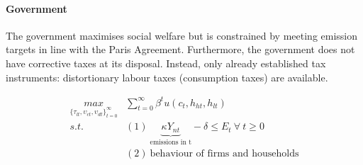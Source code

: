 \begin{comment}
\paragraph{Impossibility of reaching target in laissez-faire with exogenous growth}
\tr{Note that this is wrong! There is an option for the gov to affect inflation which then redirects demand.}
Note that with exogenous growth in each sector there is no possibility for the government to stop emissions from growing, since production of the dirty good is essential for the consumption good (no perfect substitution: $\varepsilon<\infty$). To meet the emission target, the government either needs to affect the growth rate in the economy; i.e., $\upsilon_j$ is a choice variable, or work and consumption need to be set to zero; or the emission target has to be defined in relative terms. The latter possibility contradicts the Paris Agreement which is concerned with absolute emissions.  
I therefore assume, that the government can change the growth rate.

The government chooses the growth rate in each sector, taking into account that research is constrained by an exogenous  amount of scientists
\begin{align}
\upsilon_{ct}+\upsilon_{dt}\leq\Upsilon
\end{align}
\end{comment} 
  
\paragraph{Government}

The government maximises social welfare but is constrained by meeting emission targets in line with the Paris Agreement. Furthermore, the government does not have corrective taxes at its disposal. Instead, only already established tax instruments: distortionary labour taxes (consumption taxes) are available. 

\begin{align*}
\underset{\{\tau_{lt}, \upsilon_{ct}, \upsilon_{dt}\}_{t=0}^{\infty}}{max}&\sum_{t=0}^{\infty}\beta^t u(c_{t}, h_{ht}, h_{lt})\\
s.t.\ %
& (1)\ \underbrace{\kappa Y_{nt}}_{\text{emissions in t}} -\delta \leq E_t \  \forall \ t\geq 0\\
& (2)\ \text{behaviour of firms and households}
\end{align*}

